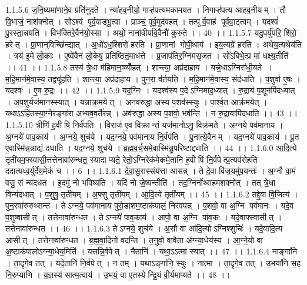 1.1.5.6
ज॒नि॒ष्यमा॑णाने॒व प्रति॑नुदते । न्या॑हव॒नीयो॒ गाऱ्ह॑पत्यमकामयत । निगाऱ्ह॑पत्य आहव॒नीयम् । तौ वि॒भाजं॒ नाश॑क्नोत् । सोऽश्व॑ पूर्व॒वाड्भू॒त्वा । प्राञ्चं॒ पूर्व॒मुद॑वहत् । तत्पूर्व॒वाह॑ पूर्ववा॒ट्त्वम् । यदश्वं॑ पु॒रस्ता॒न्नय॑ति । विभ॑क्तिरे॒वैन॑यो॒स्सा । अथो॒ नाना॑वीर्यावे॒वैनौ॑ कुरुते ।। 40 ।।
1.1.5.7
यदु॒पर्यु॑परि॒ शिरो॒ हरेत् । प्रा॒णान्‌विच्छि॑न्द्यात् । अ॒धो॑ऽध॒श्शिरो॑ हरति । प्रा॒णानां गोपी॒थाय॑ । इय॒त्यग्रे॑ हरति । अथेय॒त्यथेय॑ति । त्रय॑ इ॒मे लो॒काः । ए॒ष्वे॑वैनं॑ लो॒केषु॒ प्रति॑ष्ठित॒माध॑त्ते । प्र॒जाप॑तिर॒ग्निम॑सृजत । सो॑ऽबिभे॒त्प्र मा॑ धक्ष्य॒तीति॑ ।। 41 ।।
1.1.5.8
तस्य॑ त्रे॒धा म॑हि॒मान॒व्व्यौँ॑हत् । शान्त्या॒ अप्र॑दाहाय । यत्त्रे॒धाऽग्निरा॑धी॒यते । म॒हि॒मान॑मे॒वास्य॒ तद्व्यू॑हति । शान्त्या॒ अप्र॑दाहाय । पुन॒रा व॑र्तयति । म॒हि॒मान॑मे॒वास्य॒ संद॑धाति । प॒शुर्वा ए॒षः । यदश्वः॑ । ए॒ष रु॒द्रः ।। 42 ।।
1.1.5.9
यद॒ग्निः । यदश्व॑स्य प॒देऽग्निमा॑द॒ध्यात् । रु॒द्राय॑ प॒शूनपि॑दध्यात् । अ॒प॒शुर्यज॑मानस्स्यात् । यन्नाक्र॒मयेत् । अन॑वरुद्धा अस्य प॒शव॑स्स्युः । पा॒र्श्व॒त आक्र॑मयेत् । यथाऽऽहि॑तस्या॒ग्नेरङ्गा॑रा अभ्यव॒वर्ते॑रन्न् । अव॑रुद्धा अस्य प॒शवो॒ भव॑न्ति । न रु॒द्रायापि॑दधाति ।। 43 ।।
1.1.5.10
त्रीणि॑ ह॒वीषि॒ निर्व॑पति । वि॒राज॑ ए॒व विक्रान्तं॒ यज॑मा॒नोऽनु॒ विक्र॑मते । अ॒ग्नये॒ पव॑मानाय । अ॒ग्नये॑ पाव॒काय॑ । अ॒ग्नये॒ शुच॑ये । यद॒ग्नये॒ पव॑मानाय नि॒र्वप॑ति । पु॒नात्ये॒वैनम् । यद॒ग्नये॑ पाव॒काय॑ । पू॒त ए॒वास्मि॑न्न॒न्नाद्यं॑ दधाति । यद॒ग्नये॒ शुच॑ये । ब्र॒ह्म॒व॒र्च॒समे॒वास्मि॑न्नु॒परि॑ष्टाद्दधाति ।। 44 ।।
1.1.6.0
आ॒दि॒त्ये तृती॑यम॒फ्स्वासी॒त्तत्तेनावा॑रुन्धत॒ स्यादाप्यते॒ रेतो॒ऽग्निरेक॑मेकमे॒तानि॑ ह॒वीषि॑ नि॒र्वपेत्प्र॒त्यव॑रोहति ददात्यध्व॒र्युर्देय॒मेकं॑ च ।। 6 ।।
1.1.6.1
दे॒वा॒सु॒रास्संय॑त्ता आसन्न् । ते दे॒वा वि॑ज॒यमु॑प॒यन्तः॑ । अ॒ग्नौ वा॒मं वसु॒ सं न्य॑दधत । इ॒दमु॑ नो भविष्यति । यदि॑ नो जे॒ष्यन्तीति॑ । तद॒ग्निर्नोथ्सह॑मशक्नोत् । तत् त्रे॒धा विन्य॑दधात् । प॒शुषु॒ तृती॑यम् । अ॒फ्सु तृती॑यम् । आ॒दि॒त्ये तृती॑यम् ।। 45 ।।
1.1.6.2
तद्दे॒वा वि॒जित्य॑ । पुन॒रवा॑रुरुथ्सन्त । तेऽग्नये॒ पव॑मानाय पुरो॒डाश॑म॒ष्टाक॑पालं॒ निर॑वपन्न् । प॒शवो॒ वा अ॒ग्नि पव॑मानः । यदे॒व प॒शुष्वासीत् । तत्तेनावा॑रुन्धत । तेऽग्नये॑ पाव॒काय॑ । आपो॒ वा अ॒ग्नि पा॑व॒कः । यदे॒वाफ्स्वासीत् । तत्तेनावा॑रुन्धत ।। 46 ।।
1.1.6.3
तेऽग्नये॒ शुच॑ये । अ॒सौ वा आ॑दि॒त्योऽग्निश्शुचिः॑ । यदे॒वादि॒त्य आसीत् । तत्तेनावा॑रुन्धत । ब्र॒ह्म॒वा॒दिनो॑ वदन्ति । त॒नुवो॒ वावैता अ॑ग्न्या॒धेय॑स्य । आ॒ग्ने॒यो वा अ॒ष्टाक॑पालोऽग्न्या॒धेय॒मिति॑ । यत्तन्नि॒र्वपेत् । नैतानि॑ । यथा॒ऽऽत्मा स्यात् ।। 47 ।।
1.1.6.4
नाङ्गा॑नि । ता॒दृगे॒व तत् । यदे॒तानि॑ नि॒र्वपेत् । न तम् । यथाऽङ्गा॑नि॒ स्युः । नात्मा । ता॒दृगे॒व तत् । उ॒भया॑नि स॒ह नि॒रुप्या॑णि । य॒ज्ञस्य॑ सात्म॒त्वाय॑ । उ॒भयं॒ वा ए॒तस्येन्द्रि॒यं वी॒र्य॑माप्यते ।। 48 ।।
